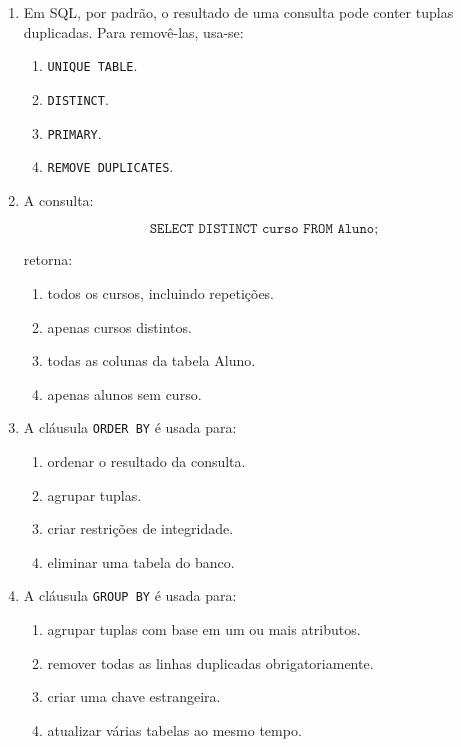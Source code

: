 \documentclass[12pt,a4paper]{article}
\begin{document}
\begin{enumerate}[label=\textbf{Q\arabic*.}]
\item Em SQL, por padrão, o resultado de uma consulta pode conter tuplas duplicadas. Para removê-las, usa-se:

\begin{enumerate}[label=\alph*)]
    \item \texttt{UNIQUE TABLE}.
    \item \texttt{DISTINCT}.
    \item \texttt{PRIMARY}.
    \item \texttt{REMOVE DUPLICATES}.
\end{enumerate}

\item A consulta:

\[
\texttt{SELECT DISTINCT curso FROM Aluno;}
\]

retorna:

\begin{enumerate}[label=\alph*)]
    \item todos os cursos, incluindo repetições.
    \item apenas cursos distintos.
    \item todas as colunas da tabela Aluno.
    \item apenas alunos sem curso.
\end{enumerate}

\item A cláusula \texttt{ORDER BY} é usada para:

\begin{enumerate}[label=\alph*)]
    \item ordenar o resultado da consulta.
    \item agrupar tuplas.
    \item criar restrições de integridade.
    \item eliminar uma tabela do banco.
\end{enumerate}

\item A cláusula \texttt{GROUP BY} é usada para:

\begin{enumerate}[label=\alph*)]
    \item agrupar tuplas com base em um ou mais atributos.
    \item remover todas as linhas duplicadas obrigatoriamente.
    \item criar uma chave estrangeira.
    \item atualizar várias tabelas ao mesmo tempo.
\end{enumerate}


\end{enumerate}
\end{document}
